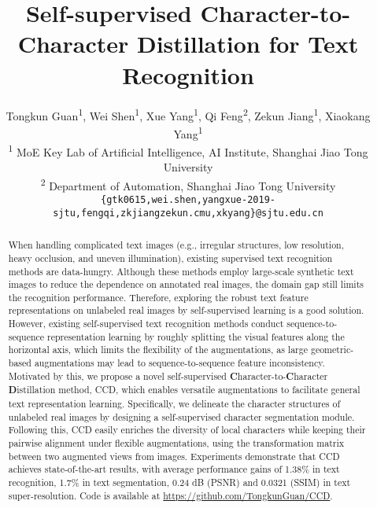 \documentclass[10pt,twocolumn,letterpaper]{article}
\begin{document}
\title{Self-supervised Character-to-Character Distillation for Text Recognition}

\author{Tongkun Guan\textsuperscript{\rm 1}, Wei Shen\textsuperscript{\rm 1\textrm{\Letter}}, Xue Yang\textsuperscript{\rm 1}, Qi Feng\textsuperscript{\rm 2}, Zekun Jiang\textsuperscript{\rm 1}, Xiaokang Yang\textsuperscript{\rm 1}
\\
\textsuperscript{\rm 1} MoE Key Lab of Artificial Intelligence, AI Institute, Shanghai Jiao Tong University\\
\textsuperscript{\rm 2} Department of Automation, Shanghai Jiao Tong University\\
{\tt\small \{gtk0615,wei.shen,yangxue-2019-sjtu,fengqi,zkjiangzekun.cmu,xkyang\}@sjtu.edu.cn}
}

\maketitle
\ificcvfinal\thispagestyle{empty}\fi

\begin{abstract}
   When handling complicated text images (e.g., irregular structures, low resolution, heavy occlusion, and uneven illumination), existing supervised text recognition methods are data-hungry. Although these methods employ large-scale synthetic text images to reduce the dependence on annotated real images, the domain gap still limits the recognition performance. Therefore, exploring the robust text feature representations on unlabeled real images by self-supervised learning is a good solution. However, existing self-supervised text recognition methods conduct sequence-to-sequence representation learning by roughly splitting the visual features along the horizontal axis, which limits the flexibility of the augmentations, as large geometric-based augmentations may lead to sequence-to-sequence feature inconsistency. Motivated by this, we propose a novel self-supervised \textbf{C}haracter-to-\textbf{C}haracter \textbf{D}istillation method, CCD, which enables versatile augmentations to facilitate general text representation learning. Specifically, we delineate the character structures of unlabeled real images by designing a self-supervised character segmentation module. Following this, CCD easily enriches the diversity of local characters while keeping their pairwise alignment under flexible augmentations, using the transformation matrix between two augmented views from images.
Experiments demonstrate that CCD achieves state-of-the-art results, with average performance gains of 1.38\% in text recognition, 1.7\% in text segmentation, 0.24 dB (PSNR) and 0.0321 (SSIM) in text super-resolution. Code is available at \url{https://github.com/TongkunGuan/CCD}.
\end{abstract}
\end{document}
